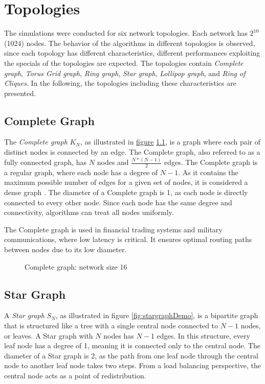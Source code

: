 \chapter{Topologies}\label{chap:topologies}
The simulations were conducted for six network topologies. Each network has $2^{10}$ (1024) nodes. The behavior of the algorithms in different topologies is observed, since each topology has different characteristics, different performances exploiting the specials of the topologies are expected. The topologies contain \textit{Complete graph}, \textit{Torus Grid graph}, \textit{Ring graph}, \textit{Star graph}, \textit{Lollipop graph}, and \textit{Ring of Cliques}. In the following, the topologies including these characteristics are presented.

\section{Complete Graph}\label{sec:2completegraph}
The \textit{Complete graph} $K_N$, as illustrated in \hyperref[fig:completegraphDemo]{figure} \ref{fig:completegraphDemo}, is a graph where each pair of distinct nodes is connected by an edge. The Complete graph, also referred to as a fully connected graph, has $N$ nodes and $\frac{N*(N-1)}{2}$ edges. The Complete graph is a regular graph, where each node has a degree of $N-1$. As it contains the maximum possible number of edges for a given set of nodes, it is considered a dense graph \cite{GraphTheorySchindelhaauer2021}. The diameter of a Complete graph is 1, as each node is directly connected to every other node. Since each node has the same degree and connectivity, algorithms can treat all nodes uniformly.

The Complete graph is used in financial trading systems and military communications, where low latency is critical. It ensures optimal routing paths between nodes due to its low diameter. \cite{Banerjee2001}

\begin{figure}[H]
    \centering
    
    \caption{Complete graph: network size 16}
    \label{fig:completegraphDemo}
\end{figure}

\section{Star Graph}\label{sec:2stargraph}
A \textit{Star graph} $S_N$, as illustrated in figure \ref{fig:stargraphDemo}, is a bipartite graph \cite{west2001introduction} that is structured like a tree with a single central node connected to $N-1$ nodes, or leaves. A Star graph with $N$ nodes has $N-1$ edges. In this structure, every leaf node has a degree of 1, meaning it is connected only to the central node. The diameter of a Star graph is 2, as the path from one leaf node through the central node to another leaf node takes two steps. From a load balancing perspective, the central node acts as a point of redistribution.

